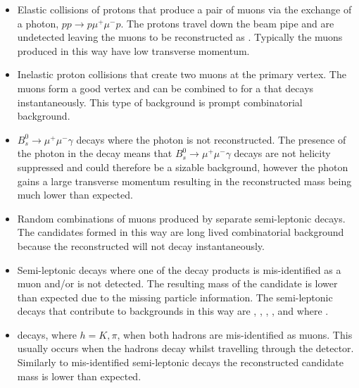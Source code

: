 \begin{itemize}
\item Elastic collisions of protons that produce a pair of muons via the exchange of a photon, $pp \to p \mu^{+} \mu^{-} p$. The protons travel down the beam pipe and are undetected leaving the muons to be reconstructed as \bmumu. Typically the muons produced in this way have low transverse momentum. %
\item Inelastic proton collisions that create two muons at the primary vertex. The muons form a good vertex and can be combined to for a \bsd that decays instantaneously. This type of background is prompt combinatorial background. 
\item $B_{s}^{0}\to\mu^{+}\mu^{-}\gamma$ decays where the photon is not reconstructed. The presence of the photon in the decay means that $B_{s}^{0}\to\mu^{+}\mu^{-}\gamma$ decays are not helicity suppressed and could therefore be a sizable background, however the photon gains a large transverse momentum resulting in the reconstructed \bsd mass being much lower than expected.
\item Random combinations of muons produced by separate semi-leptonic decays. The \bmumu candidates formed in this way are long lived combinatorial background because the reconstructed \bsd will not decay instantaneously. %
\item Semi-leptonic decays where one of the decay products is mis-identified as a muon and/or is not detected. The resulting mass of the \bsd candidate is lower than expected due to the missing particle information. The semi-leptonic decays that contribute to \bmumu backgrounds in this way are \bdpimunu, \bsKmunu, \lambdab, \bupimumu, \bdpimumu and \bcjpsimunu where \jpsimumu. %
\item \bhh decays, where $ h  = K, \pi$, when both hadrons are mis-identified as muons. This usually occurs when the hadrons decay whilst travelling through the detector. Similarly to mis-identified semi-leptonic decays the reconstructed \bsd candidate mass is lower than expected. %
\end{itemize}

